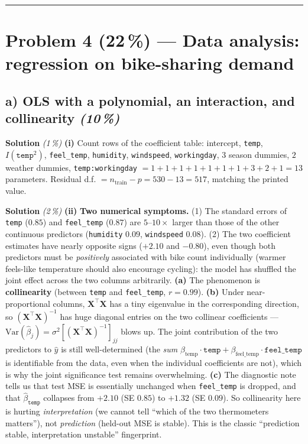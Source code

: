 \documentclass[11pt,a4paper]{article}
\newcommand{\points}[1]{\textbf{(#1\,\%)}}
\newcommand{\subpoints}[1]{\textit{(#1\,\%)}}
\newcommand{\sol}{\noindent\textbf{Solution}}
\begin{document}
\vspace{0.6em}
\hrule
\vspace{1em}

\section*{Problem 4 \points{22} --- Data analysis: regression on bike-sharing demand}

\subsection*{a) OLS with a polynomial, an interaction, and collinearity \subpoints{10}}

\sol{} \subpoints{1} \textbf{(i)} Count rows of the coefficient table: intercept,
\texttt{temp}, $I(\texttt{temp}^2)$, \texttt{feel\_temp}, \texttt{humidity}, \texttt{windspeed},
\texttt{workingday}, $3$ season dummies, $2$ weather dummies, \texttt{temp:workingday} $= 1 + 1 +
1 + 1 + 1 + 1 + 1 + 3 + 2 + 1 = \boxed{13}$ parameters. Residual d.f. $= n_{\text{train}} - p = 530
- 13 = 517$, matching the printed value. \checkmark

\medskip
\sol{} \subpoints{2} \textbf{(ii)} \textbf{Two numerical symptoms.} (1) The standard errors of
\texttt{temp} ($0.85$) and \texttt{feel\_temp} ($0.87$) are $5$--$10\times$ larger than those of the
other continuous predictors (\texttt{humidity} $0.09$, \texttt{windspeed} $0.08$). (2) The two
coefficient estimates have nearly opposite signs ($+2.10$ and $-0.80$), even though both predictors
must be \emph{positively} associated with bike count individually (warmer feels-like temperature
should also encourage cycling): the model has shuffled the joint effect across the two columns
arbitrarily.
\textbf{(a)} The phenomenon is \textbf{collinearity} (between
\texttt{temp} and \texttt{feel\_temp}, $r = 0.99$).
\textbf{(b)} Under near-proportional columns, $\mathbf X^\top\mathbf X$ has a tiny eigenvalue in
the corresponding direction, so $(\mathbf X^\top\mathbf X)^{-1}$ has huge diagonal entries on the
two collinear coefficients --- $\mathrm{Var}(\hat\beta_j) = \sigma^2[(\mathbf X^\top\mathbf X)^{-1}]_{jj}$
blows up. The joint contribution of the two predictors to $\hat y$ is still well-determined
(the \emph{sum} $\beta_{\text{temp}}\cdot\texttt{temp} + \beta_{\text{feel\_temp}}\cdot\texttt{feel\_temp}$
is identifiable from the data, even when the individual coefficients are not), which is why the
joint significance test remains overwhelming.
\textbf{(c)} The diagnostic note tells us that test MSE is essentially unchanged when
\texttt{feel\_temp} is dropped, and that $\hat\beta_{\texttt{temp}}$ collapses from $+2.10$ (SE $0.85$)
to $+1.32$ (SE $0.09$). So collinearity here is hurting \emph{interpretation} (we cannot tell
``which of the two thermometers matters''), not \emph{prediction} (held-out MSE is stable).
This is the classic ``prediction stable, interpretation unstable'' fingerprint.
\end{document}
